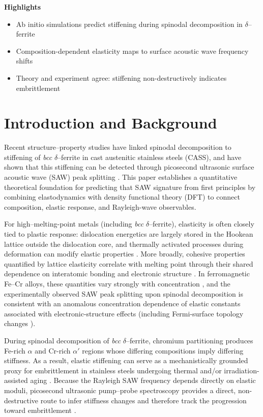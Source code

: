 \documentclass[final,3p,times]{elsarticle}
\begin{document}
\textbf{Highlights}

\begin{itemize}
\item Ab initio simulations predict stiffening during spinodal decomposition in $\delta$--ferrite
\item Composition-dependent elasticity maps to surface acoustic wave frequency shifts
\item Theory and experiment agree: stiffening non-destructively indicates embrittlement
\end{itemize}


\section{Introduction and Background}
Recent structure--property studies have linked spinodal decomposition to stiffening of \textit{bcc} $\delta$--ferrite in cast austenitic stainless steels (CASS), and have shown that this stiffening can be detected through picosecond ultrasonic surface acoustic wave (SAW) peak splitting \cite{al2023detecting, al2020detecting,al2020non}.
This paper establishes a quantitative theoretical foundation for predicting that SAW signature from first principles by combining elastodynamics with density functional theory (DFT) to connect composition, elastic response, and Rayleigh-wave observables.

For high--melting-point metals (including \textit{bcc} $\delta$--ferrite), elasticity is often closely tied to plastic response: dislocation energetics are largely stored in the Hookean lattice outside the dislocation core, and thermally activated processes during deformation can modify elastic properties \cite{pugh1954xcii}.
More broadly, cohesive properties quantified by lattice elasticity correlate with melting point through their shared dependence on interatomic bonding and electronic structure \cite{chang1966correlation,fine1984elastic, korzhavyi2009electronic, razumovskiy2011first, hosemann2018materials}.
In ferromagnetic Fe--Cr alloys, these quantities vary strongly with concentration \cite{korzhavyi2009electronic}, and the experimentally observed SAW peak splitting upon spinodal decomposition is consistent with an anomalous concentration dependence of elastic constants associated with electronic-structure effects (including Fermi-surface topology changes \cite{razumovskiy2011first}).

During spinodal decomposition of \textit{bcc} $\delta$--ferrite, chromium partitioning produces Fe-rich $\alpha$ and Cr-rich $\alpha'$ regions whose differing compositions imply differing stiffness. As a result, elastic stiffening can serve as a mechanistically grounded proxy for embrittlement in stainless steels undergoing thermal and/or irradiation-assisted aging \cite{du2017facile, sdajani2019cassspinodal,al2020non, hofmann2019transient, al2020detecting,byun2016thermal,lach2020precipitation}.
Because the Rayleigh SAW frequency depends directly on elastic moduli, picosecond ultrasonic pump--probe spectroscopy provides a direct, non-destructive route to infer stiffness changes and therefore track the progression toward embrittlement \cite{hofmann2019transient}.
\end{document}
